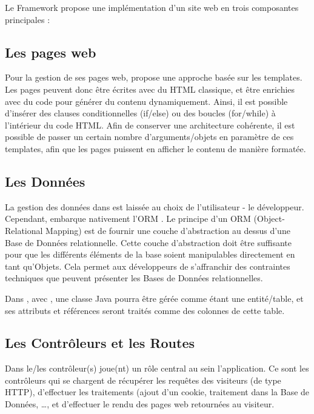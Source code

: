 Le Framework \kwplay{} propose une implémentation d'un site web en trois composantes principales :


\subsection{Les pages web}
Pour la gestion de ses pages web, \kwplay{} propose une approche basée sur les templates. Les pages peuvent donc être écrites avec du HTML classique, et être enrichies avec du code \kwscala{} pour générer du contenu dynamiquement. Ainsi, il est possible d'insérer des clauses conditionnelles (if/else) ou des boucles (for/while) à l'intérieur du code HTML. Afin de conserver une architecture cohérente, il est possible de passer un certain nombre d'arguments/objets en paramètre de ces templates, afin que les pages puissent en afficher le contenu de manière formatée.

\subsection{Les Données}
La gestion des données dans \kwplay{} est laissée au choix de l'utilisateur - le développeur. Cependant, \kwplay{} embarque nativement l'ORM \kwebean{}. Le principe d'un ORM (Object-Relational Mapping) est de fournir une couche d'abstraction au dessus d'une Base de Données relationnelle. Cette couche d'abstraction doit être suffisante pour que les différents éléments de la base soient manipulables directement en tant qu'Objets. Cela permet aux développeurs de s'affranchir des contraintes techniques que peuvent présenter les Bases de Données relationnelles.

Dans \kwplay{}, avec \kwebean{}, une classe Java pourra être gérée comme étant une entité/table, et ses attributs et références seront traités comme des colonnes de cette table.

\subsection{Les Contrôleurs et les Routes}
Dans \kwplay{} le/les contrôleur(s) joue(nt) un rôle central au sein l'application. Ce sont les contrôleurs qui se chargent de récupérer les requêtes des visiteurs (de type HTTP), d'effectuer les traitements (ajout d'un cookie, traitement dans la Base de Données, \dots, et d'effectuer le rendu des pages web retournées au visiteur.

